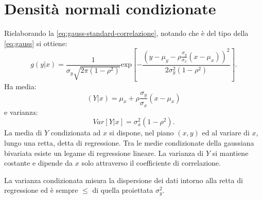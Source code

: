\section{Densità normali condizionate} %
\label{sec:densità-normali-condizionate}
Rielaborando la \ref{eq:gauss-standard-correlazione}, notando che è del tipo della \ref{eq:gauss} si ottiene:
\begin{equation}
g\left( y|x \right) =\frac { 1 }{ { \sigma  }_{ y }\sqrt { 2\pi \left( 1-{ \rho  }^{ 2 } \right)  }  } \textrm{exp} \left[ -\frac { { \left( y-{ \mu }_{ y }-\rho \frac { { \sigma }_{ y } }{ { \sigma }_{ x } } \left( x-{ \mu }_{ x } \right)  \right)  }^{ 2 } }{ 2{ \sigma }_{ y }^{ 2 }\left( 1-{ \rho }^{ 2 } \right)  }  \right].
\end{equation}
Ha media:
\[
\left( Y|x \right) =\mu _{ x }+\rho \frac { \sigma _{ y } }{ \sigma _{ x } } \left( x-\mu _{ x } \right) 
\]
e varianza:
\[
Var\left[ Y|x \right] =\sigma _{ x }^{ 2 }\left( 1-\rho ^{ 2 } \right) .
\]
La media di $Y$ condizionata ad $x$ si dispone, nel piano $(x,y)$ ed al variare di $x$, lungo una retta, detta di regressione. Tra le medie condizionate della gaussiana bivariata esiste un legame di regressione lineare. La varianza di $Y$ si mantiene costante e dipende da $x$ solo attraverso il coefficiente di correlazione.

La varianza condizionata misura la dispersione dei dati intorno alla retta di regressione ed è sempre $\le$ di quella proiettata $\sigma_{y}^{2}$.